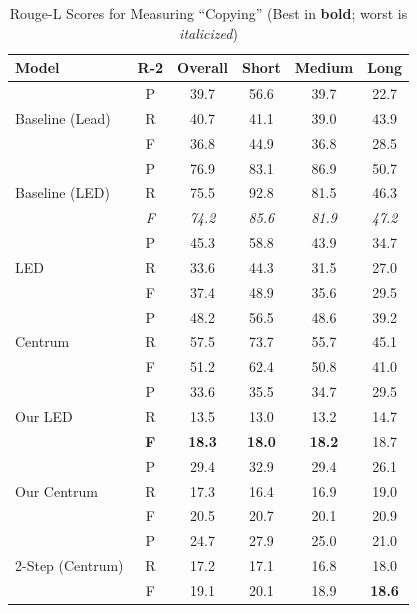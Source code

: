 \documentclass[12pt, twocolumn]{article}
\numberwithin{equation}{section}
\begin{document}
\begin{table}
    \centering
    \footnotesize
    \begin{tabular}{|p{1.5cm}|c|c|c|c|c|}
    \hline
        Model & R-2 & Overall & Short & Medium & Long \\ \hline
        \multirow{3}{1.5cm}{Baseline (Lead)} 
	& P & 39.7 & 56.6 & 39.7 & 22.7 \\ \cline{2-6}
        & R & 40.7 & 41.1 & 39.0 & 43.9 \\ \cline{2-6}
        & F & 36.8 & 44.9 & 36.8 & 28.5 \\ \hline
        \multirow{3}{1.5cm}{Baseline (LED)} 
	& P & 76.9 & 83.1 & 86.9 & 50.7 \\ \cline{2-6}
        & R & 75.5 & 92.8 & 81.5 & 46.3 \\ \cline{2-6}
        & \textit{F} & \textit{74.2} & \textit{85.6} & \textit{81.9} & \textit{47.2} \\ \hline
        \multirow{3}{1.5cm}{LED} 
	& P & 45.3 & 58.8 & 43.9 & 34.7 \\ \cline{2-6}
        & R & 33.6 & 44.3 & 31.5 & 27.0 \\ \cline{2-6}
        & F & 37.4 & 48.9 & 35.6 & 29.5 \\ \hline
        \multirow{3}{1.5cm}{Centrum} 
	& P & 48.2 & 56.5 & 48.6 & 39.2 \\ \cline{2-6}
        & R & 57.5 & 73.7 & 55.7 & 45.1 \\ \cline{2-6}
        & F & 51.2 & 62.4 & 50.8 & 41.0 \\ \hline
        \multirow{3}{1.5cm}{Our LED} 
	& P & 33.6 & 35.5 & 34.7 & 29.5 \\ \cline{2-6}
        & R & 13.5 & 13.0 & 13.2 & 14.7 \\ \cline{2-6}
        & \textbf{F} & \textbf{18.3} & \textbf{18.0} & \textbf{18.2} & 18.7 \\ \hline
        \multirow{3}{1.5cm}{Our Centrum} 
	& P & 29.4 & 32.9 & 29.4 & 26.1 \\ \cline{2-6}
        & R & 17.3 & 16.4 & 16.9 & 19.0 \\ \cline{2-6}
        & F & 20.5 & 20.7 & 20.1 & 20.9 \\ \hline
        \multirow{3}{1.5cm}{2-Step (Centrum)} 
	& P & 24.7 & 27.9 & 25.0 & 21.0 \\ \cline{2-6}
        & R & 17.2 & 17.1 & 16.8 & 18.0 \\ \cline{2-6}
        & F & 19.1 & 20.1 & 18.9 & \textbf{18.6} \\ \hline
    \end{tabular}
    \caption{Rouge-L Scores for Measuring ``Copying'' (Best in \textbf{bold}; worst is \textit{italicized})}
    \label{tab:rouge-l-copy}
\end{table}
\end{document}

